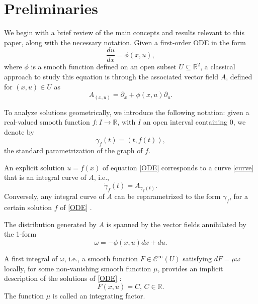 \documentclass{article}
\theoremstyle{remark}
\theoremstyle{definition}
\begin{document}
\section{Preliminaries}\label{preliminaries}
We begin with a brief review of the main concepts and results relevant to this paper, along with the necessary notation. Given a first-order ODE in the form  
\begin{equation}\label{ODE}  
    \frac{du}{dx}=\phi(x,u),  
\end{equation}  
where \( \phi \) is a smooth function defined on an open subset \( U\subseteq \mathbb{R}^2 \), a classical approach to study this equation is through the associated vector field $A$, defined for $(x,u)\in U$ as
\begin{equation}\label{campoA}  
    A_{(x,u)}=\partial_x+\phi(x,u)\partial_u.
\end{equation}  

To analyze solutions geometrically, we introduce the following notation: given a real-valued smooth function $f: I\to \mathbb R$, with $I$ an open interval containing 0, we denote by
\begin{equation}\label{curve}  
    \gamma_f(t)=(t,f(t)),
\end{equation}
the standard parametrization of the graph of $f$.


An explicit solution $u=f(x)$ of equation \eqref{ODE} corresponds to a curve \eqref{curve} that is an integral curve of $A$, i.e., 
$$
\dot{\gamma}_f(t)=A_{\gamma_f(t)}.
$$
Conversely, any integral curve of $A$ can be reparametrized to the form $\gamma_f$, for a certain solution $f$ of \eqref{ODE} \cite{arnold1992ordinary,stephani}.





The distribution generated by $A$ is spanned by the vector fields annihilated by the 1-form
\begin{equation}\label{1form}  
    \omega=-\phi(x,u)dx+du.
\end{equation}

A first integral of $\omega$, i.e., a smooth function $F\in \mathcal{C}^{\infty}(U)$ satisfying $dF=\mu \omega$ locally, for some non-vanishing smooth function $\mu$, provides an implicit description of the solutions of \eqref{ODE} \cite{arnold1992ordinary,stephani}:
$$
F(x,u)=C, \,C \in \mathbb R.
$$
The function $\mu$ is called an integrating factor. 
\end{document}
